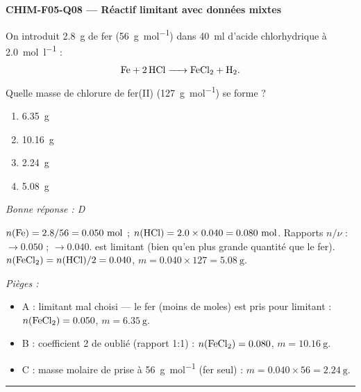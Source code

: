 \documentclass[11pt,a4paper]{article}
\begin{document}
\noindent\textbf{CHIM-F05-Q08 --- Réactif limitant avec données mixtes}\par
On introduit \qty{2.8}{\gram} de fer (\qty{56}{\gram\per\mole}) dans \qty{40}{\milli\litre} d'acide chlorhydrique à \qty{2.0}{\mole\per\litre} :
\[\ce{Fe + 2 HCl -> FeCl2 + H2}.\]
Quelle masse de chlorure de fer(II) (\qty{127}{\gram\per\mole}) se forme ?
\begin{enumerate}[label=\Alph*)]
\item \qty{6.35}{\gram}
\item \qty{10.16}{\gram}
\item \qty{2.24}{\gram}
\item \qty{5.08}{\gram}
\end{enumerate}
\textit{Bonne réponse : D}\par
$n(\ce{Fe})=\num{2.8}/\num{56}=\num{0.050}~\si{\mole}$ ; $n(\ce{HCl})=\num{2.0}\times\num{0.040}=\num{0.080}~\si{\mole}$. Rapports $n/\nu$ :  $\to\num{0.050}$ ;  $\to\num{0.040}$.  est limitant (bien qu'en plus grande quantité que le fer). $n(\ce{FeCl2})=n(\ce{HCl})/\num{2}=\num{0.040}$, $m=\num{0.040}\times\num{127}=\qty{5.08}{\gram}$.\par
\textit{Pièges :}
\begin{itemize}
\item A : limitant mal choisi — le fer (moins de moles) est pris pour limitant : $n(\ce{FeCl2})=\num{0.050}$, $m=\qty{6.35}{\gram}$.
\item B : coefficient \num{2} de  oublié (rapport \num{1}:\num{1}) : $n(\ce{FeCl2})=\num{0.080}$, $m=\qty{10.16}{\gram}$.
\item C : masse molaire de  prise à \qty{56}{\gram\per\mole} (fer seul) : $m=\num{0.040}\times\num{56}=\qty{2.24}{\gram}$.
\end{itemize}
\vspace{6pt}\hrule\vspace{8pt}
\end{document}
